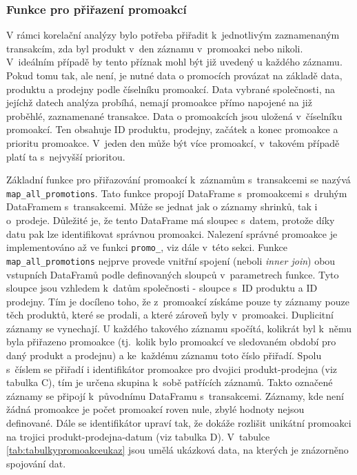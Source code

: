 \subsubsection*{Funkce pro přiřazení promoakcí}

V rámci korelační analýzy bylo potřeba přiřadit k~jednotlivým zaznamenaným transakcím, zda byl produkt v~den záznamu v~promoakci nebo nikoli. V~ideálním případě by tento příznak mohl být již uvedený u každého záznamu. Pokud tomu tak, ale není, je nutné data o promocích provázat na základě data, produktu a prodejny podle číselníku promoakcí. Data vybrané společnosti, na jejíchž datech analýza probíhá, nemají promoakce přímo napojené na již proběhlé, zaznamenané transakce. Data o promoakcích jsou uložená v~číselníku promoakcí. Ten obsahuje ID produktu, prodejny, začátek a konec promoakce a prioritu promoakce. V~jeden den může být více promoakcí, v~takovém případě platí ta s~nejvyšší prioritou.

Základní funkce pro přiřazování promoakcí k~záznamům s~transakcemi se nazývá \texttt{map\_all\_promotions}. Tato funkce propojí DataFrame s~promoakcemi s~druhým DataFramem s~transakcemi. Může se jednat jak o záznamy shrinků, tak i o~prodeje. Důležité je, že tento DataFrame má sloupec s~datem, protože díky datu pak lze identifikovat správnou promoakci. Nalezení správné promoakce je implementováno až ve funkci \texttt{promo\_}, viz dále v~této sekci. Funkce \texttt{map\_all\_promotions} nejprve provede vnitřní spojení (neboli \emph{inner join}) obou vstupních DataFramů podle definovaných sloupců v~parametrech funkce. Tyto sloupce jsou vzhledem k~datům společnosti - sloupce s~ID produktu a ID prodejny. Tím je docíleno toho, že z~promoakcí získáme pouze ty záznamy pouze těch produktů, které se prodali, a které zároveň byly v~promoakci. Duplicitní záznamy se vynechají. U každého takového záznamu spočítá, kolikrát byl k~němu byla přiřazeno promoakce (tj.~kolik bylo promoakcí ve sledovaném období pro daný produkt a prodejnu) a ke~každému záznamu toto číslo přiřadí. Spolu s~číslem se přiřadí i identifikátor promoakce pro dvojici produkt-prodejna (viz tabulka C), tím je určena skupina k~sobě patřících záznamů. Takto označené záznamy se připojí k~původnímu DataFramu s~transakcemi. Záznamy, kde není žádná promoakce je počet promoakcí roven nule, zbylé hodnoty nejsou definované.
Dále se identifikátor upraví tak, že dokáže rozlišit unikátní promoakci na trojici produkt-prodejna-datum (viz tabulka D). V~tabulce \ref*{tab:tabulkypromoakceukaz} jsou umělá ukázková data, na kterých je znázorněno spojování dat.

